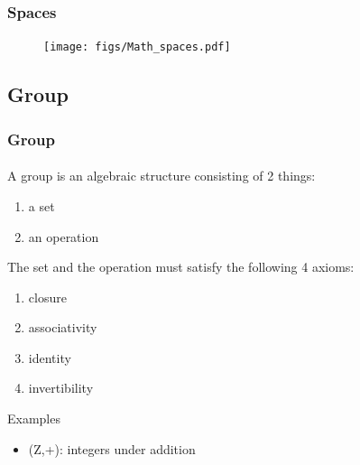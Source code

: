 \begin{frame}
\frametitle{Spaces}
\framesubtitle{}
\logoCSIPCPL\mypagenum\mypagenum
	\begin{figure}
		\texttt{[image: figs/Math\_spaces.pdf]}
	\end{figure}
\end{frame}


\subsection{Group}
\begin{frame}
\frametitle{Group}
\framesubtitle{}
\logoCSIPCPL\mypagenum\mypagenum
	A group is an algebraic structure consisting of 2 things:
	\begin{enumerate}
		\item a set
		\item an operation
	\end{enumerate}
	The set and the operation must satisfy the following 4 axioms:
	\begin{enumerate}
		\item closure
		\item associativity
		\item identity
		\item invertibility
	\end{enumerate}
	Examples
	\begin{itemize}
		\item (Z,+): integers under addition
	\end{itemize}
\end{frame}





